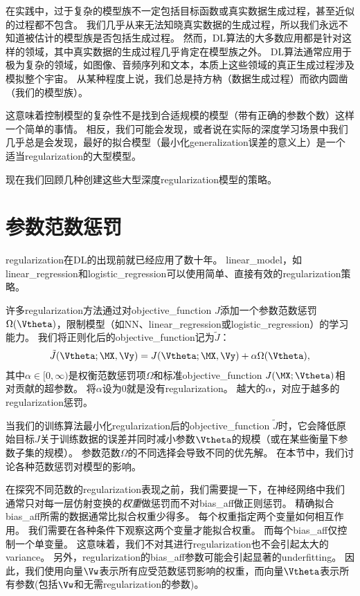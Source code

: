 在实践中，过于复杂的模型族不一定包括目标函数或真实数据生成过程，甚至近似的过程都不包含。
我们几乎从来无法知晓真实数据的生成过程，所以我们永远不知道被估计的模型族是否包括生成过程。
然而，\gls{DL}算法的大多数应用都是针对这样的领域，其中真实数据的生成过程几乎肯定在模型族之外。
\gls{DL}算法通常应用于极为复杂的领域，如图像、音频序列和文本，本质上这些领域的真正生成过程涉及模拟整个宇宙。
从某种程度上说，我们总是持方枘（数据生成过程）而欲内圆凿（我们的模型族）。

这意味着控制模型的复杂性不是找到合适规模的模型（带有正确的参数个数）这样一个简单的事情。
相反，我们可能会发现，或者说在实际的深度学习场景中我们几乎总是会发现，最好的拟合模型（最小化\gls{generalization}误差的意义上）是一个适当\gls{regularization}的大型模型。

现在我们回顾几种创建这些大型深度\gls{regularization}模型的策略。


\section{参数范数惩罚}
\label{sec:parameter_norm_penalties}
\gls{regularization}在\gls{DL}的出现前就已经应用了数十年。
\gls{linear_model}，如\gls{linear_regression}和\gls{logistic_regression}可以使用简单、直接有效的\gls{regularization}策略。

许多\gls{regularization}方法通过对\gls{objective_function} $J$添加一个参数范数惩罚$\Omega(\Vtheta)$，限制模型（如\gls{NN}、\gls{linear_regression}或\gls{logistic_regression}）的学习能力。
我们将正则化后的\gls{objective_function}记为$\tilde{J}$：
\begin{align}
 \tilde{J}(\Vtheta;\MX, \Vy) = J(\Vtheta;\MX, \Vy) + \alpha \Omega(\Vtheta),
\end{align}
其中$\alpha \in [0, \infty)$是权衡范数惩罚项$\Omega$和标准\gls{objective_function} $J(\MX;\Vtheta)$相对贡献的超参数。
将$\alpha$设为0就是没有\gls{regularization}。
越大的$\alpha$，对应于越多的\gls{regularization}惩罚。

当我们的训练算法最小化\gls{regularization}后的\gls{objective_function} $\tilde{J}$时，它会降低原始目标$J$关于训练数据的误差并同时减小参数$\Vtheta$的规模（或在某些衡量下参数子集的规模）。
参数范数$\Omega$的不同选择会导致不同的优先解。
在本节中，我们讨论各种范数惩罚对模型的影响。

在探究不同范数的\gls{regularization}表现之前，我们需要提一下，在神经网络中我们通常只对每一层仿射变换的\emph{权重}做惩罚而不对\gls{bias_aff}做正则惩罚。
精确拟合\gls{bias_aff}所需的数据通常比拟合权重少得多。
每个权重指定两个变量如何相互作用。
我们需要在各种条件下观察这两个变量才能拟合权重。
而每个\gls{bias_aff}仅控制一个单变量。
这意味着，我们不对其进行\gls{regularization}也不会引起太大的\gls{variance}。
另外，\gls{regularization}的\gls{bias_aff}参数可能会引起显著的\gls{underfitting}。
因此，我们使用向量$\Vw$表示所有应受范数惩罚影响的权重，而向量$\Vtheta$表示所有参数(包括$\Vw$和无需\gls{regularization}的参数)。

